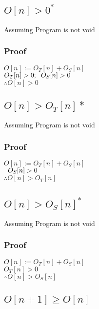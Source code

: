 \documentclass[11pt]{article}
\begin{document}
\subsection{$O[n] > 0^*$}
Assuming Program is not void
\subsubsection{Proof}
\begin{center}
$
O[n] := O_T[n] + O_S[n]
$
\\ \vspace{3mm}
$
O_T[n] > 0; \hspace{2mm} O_S[n] > 0
$
\\ \vspace{3mm}
$
\therefore O[n] > 0
$
\end{center}

\subsection{$O[n] > O_T[n]*$}
Assuming Program is not void
\subsubsection{Proof}
\begin{center}
$
O[n] := O_T[n] + O_S[n]
$
\\ \vspace{3mm}
$
\hspace{2mm} O_S[n] > 0
$
\\ \vspace{3mm}
$
\therefore O[n] > O_T[n]
$
\end{center}

\subsection{$O[n] > O_S[n]^*$}
Assuming Program is not void
\subsubsection{Proof}
\begin{center}
$
O[n] := O_T[n] + O_S[n]
$
\\ \vspace{3mm}
$
O_T[n] > 0
$
\\ \vspace{3mm}
$
\therefore O[n] > O_S[n]
$
\end{center}


\subsection{$O[n+1] \geq O[n]$}
\end{document}
